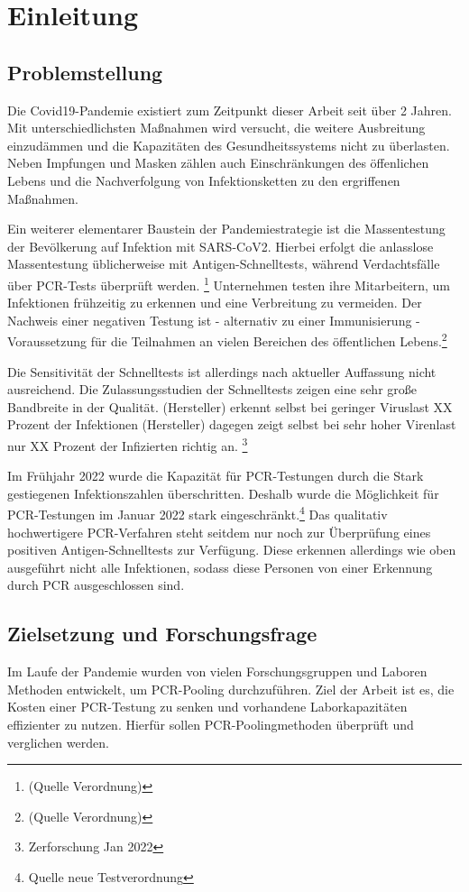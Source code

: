 \chapter{Einleitung}
\section{Problemstellung}
Die Covid19-Pandemie existiert zum Zeitpunkt dieser Arbeit seit über 2 Jahren.
Mit unterschiedlichsten Maßnahmen wird versucht, die weitere Ausbreitung einzudämmen und die Kapazitäten des Gesundheitssystems nicht zu überlasten.
Neben Impfungen und Masken zählen auch Einschränkungen des öffenlichen Lebens und die Nachverfolgung von Infektionsketten zu den ergriffenen Maßnahmen.

Ein weiterer elementarer Baustein der Pandemiestrategie ist die Massentestung der Bevölkerung auf Infektion mit SARS-CoV2.
Hierbei erfolgt die anlasslose Massentestung üblicherweise mit Antigen-Schnelltests, während Verdachtsfälle über PCR-Tests überprüft werden.
\footnote{(Quelle Verordnung)}
Unternehmen testen ihre Mitarbeitern, um Infektionen frühzeitig zu erkennen und eine Verbreitung zu vermeiden.
 Der Nachweis einer negativen Testung ist - alternativ zu einer Immunisierung - Voraussetzung für die Teilnahmen an vielen Bereichen des öffentlichen Lebens.\footnote{(Quelle Verordnung)}

Die Sensitivität der Schnelltests ist allerdings nach aktueller Auffassung nicht ausreichend.
Die Zulassungsstudien der Schnelltests zeigen eine sehr große Bandbreite in der Qualität.
(Hersteller) erkennt selbst bei geringer Viruslast XX Prozent der Infektionen
(Hersteller) dagegen zeigt selbst bei sehr hoher Virenlast nur XX Prozent der Infizierten richtig an.
\footnote{Zerforschung Jan 2022}

Im Frühjahr 2022 wurde die Kapazität für PCR-Testungen durch die Stark gestiegenen Infektionszahlen überschritten.
Deshalb wurde die Möglichkeit für PCR-Testungen im Januar 2022 stark eingeschränkt.\footnote{Quelle neue Testverordnung}
Das qualitativ hochwertigere PCR-Verfahren steht seitdem nur noch zur Überprüfung eines positiven Antigen-Schnelltests zur Verfügung.
Diese erkennen allerdings wie oben ausgeführt nicht alle Infektionen, sodass diese Personen von einer Erkennung durch PCR ausgeschlossen sind.

\section{Zielsetzung und Forschungsfrage}
Im Laufe der Pandemie wurden von vielen Forschungsgruppen und Laboren Methoden entwickelt, um PCR-Pooling durchzuführen.
Ziel der Arbeit ist es, die Kosten einer PCR-Testung zu senken und vorhandene Laborkapazitäten effizienter zu nutzen.
Hierfür sollen PCR-Poolingmethoden überprüft und verglichen werden.

